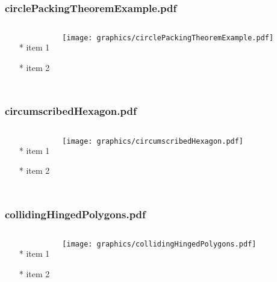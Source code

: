 \documentclass{beamer}
\begin{document}
\begin{frame} \frametitle{circlePackingTheoremExample.pdf}
    \begin{columns}[c]
        \begin{itemize}
            \item[*] item 1
            \item[*] item 2
        \end{itemize}
        \begin{minipage}{\linewidth}
            \begin{center}
            \texttt{[image: graphics/circlePackingTheoremExample.pdf]}
            \label{gfx:circlePackingTheoremExample.pdf}
            \end{center}
        \end{minipage}
    \end{columns}
\end{frame}
\begin{frame} \frametitle{circumscribedHexagon.pdf}
    \begin{columns}[c]
        \begin{itemize}
            \item[*] item 1
            \item[*] item 2
        \end{itemize}
        \begin{minipage}{\linewidth}
            \begin{center}
            \texttt{[image: graphics/circumscribedHexagon.pdf]}
            \label{gfx:circumscribedHexagon.pdf}
            \end{center}
        \end{minipage}
    \end{columns}
\end{frame}
\begin{frame} \frametitle{collidingHingedPolygons.pdf}
    \begin{columns}[c]
        \begin{itemize}
            \item[*] item 1
            \item[*] item 2
        \end{itemize}
        \begin{minipage}{\linewidth}
            \begin{center}
            \texttt{[image: graphics/collidingHingedPolygons.pdf]}
            \label{gfx:collidingHingedPolygons.pdf}
            \end{center}
        \end{minipage}
    \end{columns}
\end{frame}
\end{document}
